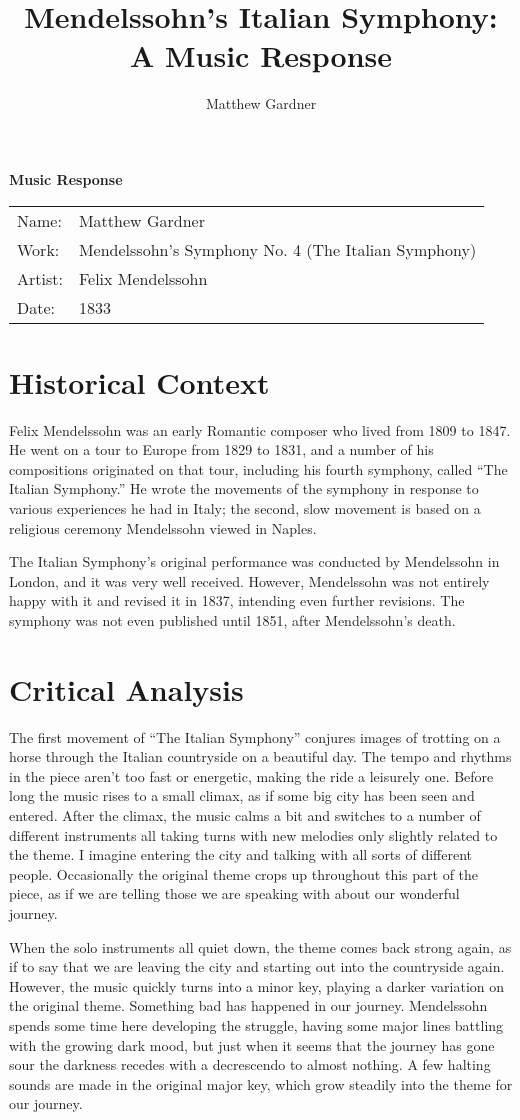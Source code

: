 \documentclass[onecolumn, 12pt]{article}
\title{Mendelssohn's Italian Symphony: A Music Response}
\author{Matthew Gardner}
\date{}
\begin{document}
\textbf{Music Response}

\begin{tabular}{ll}
  Name:&Matthew Gardner \\
  Work:&Mendelssohn's Symphony No. 4 (The Italian Symphony) \\
  Artist:&Felix Mendelssohn \\
  Date:&1833 \\
\end{tabular}


\section*{Historical Context}

Felix Mendelssohn was an early Romantic composer who lived from 1809 to 1847.
He went on a tour to Europe from 1829 to 1831, and a number of his compositions
originated on that tour, including his fourth symphony, called ``The Italian
Symphony.''  He wrote the movements of the symphony in response to various
experiences he had in Italy; the second, slow movement is based on a religious
ceremony Mendelssohn viewed in Naples.

The Italian Symphony's original performance was conducted by Mendelssohn in
London, and it was very well received.  However, Mendelssohn was not entirely
happy with it and revised it in 1837, intending even further revisions.  The
symphony was not even published until 1851, after Mendelssohn's death.

\section*{Critical Analysis}

The first movement of ``The Italian Symphony'' conjures images of trotting on a
horse through the Italian countryside on a beautiful day.  The tempo and
rhythms in the piece aren't too fast or energetic, making the ride a leisurely
one.  Before long the music rises to a small climax, as if some big city has
been seen and entered.  After the climax, the music calms a bit and switches to
a number of different instruments all taking turns with new melodies only
slightly related to the theme.  I imagine entering the city and talking with
all sorts of different people.  Occasionally the original theme crops up
throughout this part of the piece, as if we are telling those we are speaking
with about our wonderful journey.

When the solo instruments all quiet down, the theme comes back strong again, as
if to say that we are leaving the city and starting out into the countryside
again.  However, the music quickly turns into a minor key, playing a darker
variation on the original theme.  Something bad has happened in our journey.
Mendelssohn spends some time here developing the struggle, having some major
lines battling with the growing dark mood, but just when it seems that the
journey has gone sour the darkness recedes with a decrescendo to almost
nothing.  A few halting sounds are made in the original major key, which grow
steadily into the theme for our journey.
\end{document}
